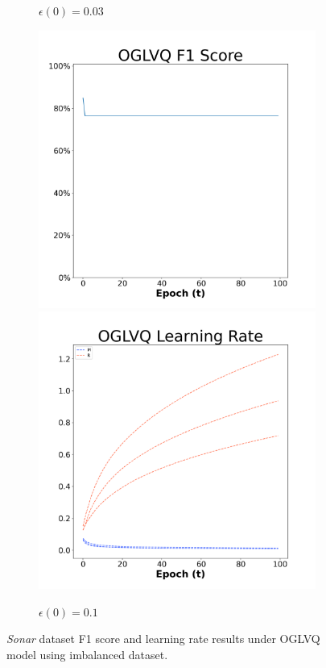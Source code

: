 \begin{figure}[H]
\begin{subfigure}{0.3\textwidth}
  \caption{$\epsilon(0)=0.03$}
\end{subfigure}\hfil %
\begin{subfigure}{0.3\textwidth}
  \includegraphics[width=\linewidth]{images/exper2/Sonar/OGLVQ_0.1_f1.png}
  \includegraphics[width=\linewidth]{images/exper2/Sonar/OGLVQ_0.1_lr.png}
  \caption{$\epsilon(0)=0.1$}
\end{subfigure}

\caption{\textit{Sonar} dataset F1 score and learning rate results under OGLVQ model using imbalanced dataset.}\label{2sonarglvq}
\end{figure}



